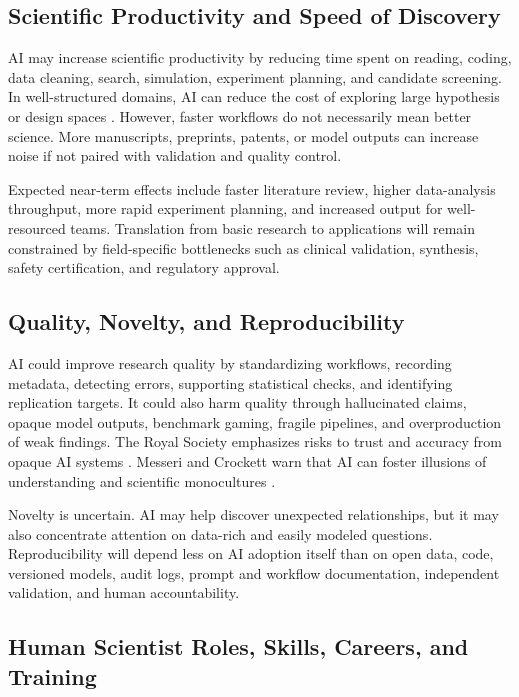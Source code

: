 \documentclass[12pt]{article}
\begin{document}
\subsection{Scientific Productivity and Speed of Discovery}

AI may increase scientific productivity by reducing time spent on reading, coding, data cleaning, search, simulation, experiment planning, and candidate screening. In well-structured domains, AI can reduce the cost of exploring large hypothesis or design spaces \cite{ref1,ref6}. However, faster workflows do not necessarily mean better science. More manuscripts, preprints, patents, or model outputs can increase noise if not paired with validation and quality control.

Expected near-term effects include faster literature review, higher data-analysis throughput, more rapid experiment planning, and increased output for well-resourced teams. Translation from basic research to applications will remain constrained by field-specific bottlenecks such as clinical validation, synthesis, safety certification, and regulatory approval.

\subsection{Quality, Novelty, and Reproducibility}

AI could improve research quality by standardizing workflows, recording metadata, detecting errors, supporting statistical checks, and identifying replication targets. It could also harm quality through hallucinated claims, opaque model outputs, benchmark gaming, fragile pipelines, and overproduction of weak findings. The Royal Society emphasizes risks to trust and accuracy from opaque AI systems \cite{ref4}. Messeri and Crockett warn that AI can foster illusions of understanding and scientific monocultures \cite{ref8}.

Novelty is uncertain. AI may help discover unexpected relationships, but it may also concentrate attention on data-rich and easily modeled questions. Reproducibility will depend less on AI adoption itself than on open data, code, versioned models, audit logs, prompt and workflow documentation, independent validation, and human accountability.

\subsection{Human Scientist Roles, Skills, Careers, and Training}
\end{document}
